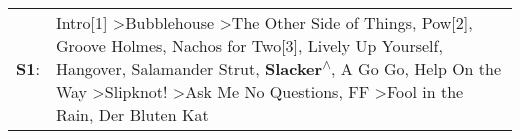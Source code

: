 \begin{supertabular}{p{0.03\textwidth}p{0.92\textwidth}}
 \textbf{S1}:  &  Intro[1]\textsuperscript{} \textgreater \enspace Bubblehouse\textsuperscript{} \textgreater \enspace The Other Side of Things\textsuperscript{}, \enspace Pow[2]\textsuperscript{}, \enspace Groove Holmes\textsuperscript{}, \enspace Nachos for Two[3]\textsuperscript{}, \enspace Lively Up Yourself\textsuperscript{}, \enspace Hangover\textsuperscript{}, \enspace Salamander Strut\textsuperscript{}, \enspace \textbf{Slacker\textsuperscript{$\wedge$}}, \enspace A Go Go\textsuperscript{}, \enspace Help On the Way\textsuperscript{} \textgreater \enspace Slipknot!\textsuperscript{} \textgreater \enspace Ask Me No Questions\textsuperscript{}, \enspace FF\textsuperscript{} \textgreater \enspace Fool in the Rain\textsuperscript{}, \enspace Der Bluten Kat\textsuperscript{}  \enspace  \\
\end{supertabular}
